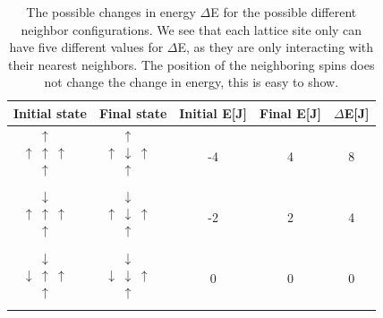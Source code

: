\documentclass[%
reprint,
nofootinbib,
amsmath,amssymb,
aps,
]{revtex4-1}
\begin{document}
\begin{table}
	\vspace{10pt}
	\caption{The possible changes in energy $\Delta$E for the possible different neighbor configurations. We see that each lattice site only can have five different values for $\Delta$E, as they are only interacting with their nearest neighbors. The position of the neighboring spins does not change the change in energy, this is easy to show.}
		\label{tab:exp}
	\begin{tabular}{@{}|c|c|c|c|c|@{}}
		\hline
		Initial state & Final state & Initial E[J] & Final E[J] & $\Delta$E[J]\\\hline
$\begin{matrix}& \uparrow & \\ \uparrow & \uparrow & \uparrow \\ & \uparrow & \\ & & & \end{matrix}$         & $\begin{matrix}& \uparrow & \\ \uparrow & \downarrow & \uparrow \\ & \uparrow & \\ & & & \end{matrix}$ & -4 & 4 &     8                  \\
$\begin{matrix}& \downarrow & \\ \uparrow & \uparrow & \uparrow \\ & \uparrow & \\ & & & \end{matrix}$       & $\begin{matrix}& \downarrow & \\ \uparrow & \downarrow & \uparrow \\ & \uparrow & \\ & & & \end{matrix}$ & -2 &  2    & 4                  \\
$\begin{matrix}& \downarrow & \\ \downarrow & \uparrow & \uparrow \\ & \uparrow & \\ & & & \end{matrix}$     & $\begin{matrix}& \downarrow & \\ \downarrow & \downarrow & \uparrow \\ & \uparrow & \\ & & & \end{matrix}$ & 0 & 0   & 0                  \\

\end{tabular}
\end{table}
\end{document}
